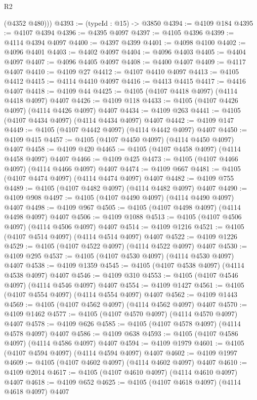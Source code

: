 \begin{lexlean}{R2}
\begin{coremodule}
        (@4352 @480)))
@4393 := (typeId : @15) -> @3850
@4394 := @4109 @184
@4395 := @4107 @4394
@4396 := @4395 @4097
@4397 := @4105 @4396
@4399 := @4114 @4394 @4097
@4400 := @4397 @4399
@4401 := @4098 @4100
@4402 := @4096 @4401
@4403 := @4402 @4097
@4404 := @4096 @4403
@4405 := @4404 @4097
@4407 := @4096 @4405 @4097
@4408 := @4400 @4407
@4409 := @4117 @4407
@4410 := @4109 @27
@4412 := @4107 @4410 @4097
@4413 := @4105 @4412
@4415 := @4114 @4410 @4097
@4416 := @4413 @4415
@4417 := @4416 @4407
@4418 := @4109 @44
@4425 := @4105 (@4107 @4418 @4097) (@4114 @4418 @4097) @4407
@4426 := @4109 @118
@4433 := @4105 (@4107 @4426 @4097) (@4114 @4426 @4097) @4407
@4434 := @4109 @263
@4441 := @4105 (@4107 @4434 @4097) (@4114 @4434 @4097) @4407
@4442 := @4109 @147
@4449 := @4105 (@4107 @4442 @4097) (@4114 @4442 @4097) @4407
@4450 := @4109 @415
@4457 := @4105 (@4107 @4450 @4097) (@4114 @4450 @4097) @4407
@4458 := @4109 @420
@4465 := @4105 (@4107 @4458 @4097) (@4114 @4458 @4097) @4407
@4466 := @4109 @425
@4473 := @4105 (@4107 @4466 @4097) (@4114 @4466 @4097) @4407
@4474 := @4109 @667
@4481 := @4105 (@4107 @4474 @4097) (@4114 @4474 @4097) @4407
@4482 := @4109 @755
@4489 := @4105 (@4107 @4482 @4097) (@4114 @4482 @4097) @4407
@4490 := @4109 @908
@4497 := @4105 (@4107 @4490 @4097) (@4114 @4490 @4097) @4407
@4498 := @4109 @967
@4505 := @4105 (@4107 @4498 @4097) (@4114 @4498 @4097) @4407
@4506 := @4109 @1088
@4513 := @4105 (@4107 @4506 @4097) (@4114 @4506 @4097) @4407
@4514 := @4109 @1216
@4521 := @4105 (@4107 @4514 @4097) (@4114 @4514 @4097) @4407
@4522 := @4109 @1226
@4529 := @4105 (@4107 @4522 @4097) (@4114 @4522 @4097) @4407
@4530 := @4109 @295
@4537 := @4105 (@4107 @4530 @4097) (@4114 @4530 @4097) @4407
@4538 := @4109 @1359
@4545 := @4105 (@4107 @4538 @4097) (@4114 @4538 @4097) @4407
@4546 := @4109 @310
@4553 := @4105 (@4107 @4546 @4097) (@4114 @4546 @4097) @4407
@4554 := @4109 @1427
@4561 := @4105 (@4107 @4554 @4097) (@4114 @4554 @4097) @4407
@4562 := @4109 @1443
@4569 := @4105 (@4107 @4562 @4097) (@4114 @4562 @4097) @4407
@4570 := @4109 @1462
@4577 := @4105 (@4107 @4570 @4097) (@4114 @4570 @4097) @4407
@4578 := @4109 @626
@4585 := @4105 (@4107 @4578 @4097) (@4114 @4578 @4097) @4407
@4586 := @4109 @638
@4593 := @4105 (@4107 @4586 @4097) (@4114 @4586 @4097) @4407
@4594 := @4109 @1979
@4601 := @4105 (@4107 @4594 @4097) (@4114 @4594 @4097) @4407
@4602 := @4109 @1997
@4609 := @4105 (@4107 @4602 @4097) (@4114 @4602 @4097) @4407
@4610 := @4109 @2014
@4617 := @4105 (@4107 @4610 @4097) (@4114 @4610 @4097) @4407
@4618 := @4109 @652
@4625 := @4105 (@4107 @4618 @4097) (@4114 @4618 @4097) @4407

\end{coremodule}
\end{lexlean}
